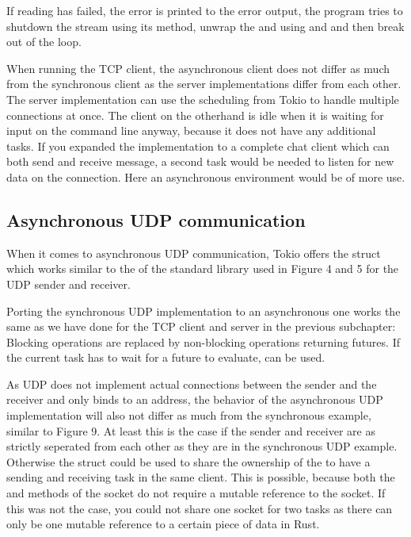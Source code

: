 If reading has failed, the error is printed to the error output, the program tries to shutdown the stream using its
 method, unwrap the  and  using  and  and then break out
of the loop.

When running the TCP client, the asynchronous client does not differ as much from the synchronous client as the server
implementations differ from each other. The server implementation can use the scheduling from Tokio to handle multiple
connections at once. The client on the otherhand is idle when it is waiting for input on the command line anyway,
because it does not have any additional tasks. If you expanded the implementation to a complete chat client which can
both send and receive message, a second task would be needed to listen for new data on the connection. Here an
asynchronous environment would be of more use.

\subsection{Asynchronous UDP communication}
When it comes to asynchronous UDP communication, Tokio offers the struct  which works
similar to the  of the standard library used in Figure 4 and 5 for the UDP sender and receiver.

Porting the synchronous UDP implementation to an asynchronous one works the same as we have done for the TCP client and
server in the previous subchapter: Blocking operations are replaced by non-blocking operations returning futures. If
the current task has to wait for a future to evaluate,  can be used.

As UDP does not implement actual connections between the sender and the receiver and only binds to an address, the
behavior of the asynchronous UDP implementation will also not differ as much from the synchronous example, similar to
Figure 9. At least this is the case if the sender and receiver are as strictly seperated from each other as they are in
the synchronous UDP example. Otherwise the struct  could be used to share the ownership of the
 to have a sending and receiving task in the same client. This is possible, because both the
 and  methods of the socket do not require a mutable reference to the socket. If this was
not the case, you could not share one socket for two tasks as there can only be one mutable reference to a certain
piece of data in Rust.
